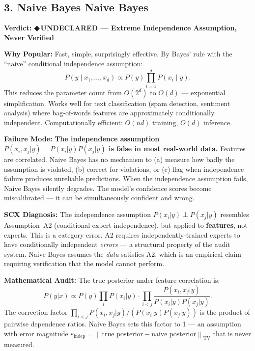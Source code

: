 \documentclass[12pt,a4paper]{article}
\theoremstyle{definition}
\newcommand{\guilty}{{\color{guiltycolor}\textbf{◆\,UNDECLARED}}}
\DeclareMathOperator{\TV}{TV}
\newcommand{\norm}[1]{\left\lVert#1\right\rVert}
\newcommand{\auditHeader}[1]{\medskip\noindent\textbf{\large #1}\medskip}
\newcommand{\whyPopular}{\noindent\textbf{Why Popular:} }
\newcommand{\whyFail}{\noindent\textbf{Failure Mode:} }
\newcommand{\diagnosis}{\noindent\textbf{SCX Diagnosis:} }
\newcommand{\mathAudit}{\noindent\textbf{Mathematical Audit:} }
\begin{document}
\subsection{3. Naive Bayes Naive Bayes}

\auditHeader{Verdict: \guilty{} — Extreme Independence Assumption, Never Verified}

\whyPopular{} Fast, simple, surprisingly effective. By Bayes' rule with the ``naive'' conditional independence assumption:
\[
P(y \mid x_1, \ldots, x_d) \propto P(y) \prod_{i=1}^d P(x_i \mid y).
\]
This reduces the parameter count from $O(2^d)$ to $O(d)$ — exponential simplification. Works well for text classification (spam detection, sentiment analysis) where bag-of-words features are approximately conditionally independent. Computationally efficient: $O(nd)$ training, $O(d)$ inference.

\whyFail{} \textbf{The independence assumption $P(x_i, x_j|y) = P(x_i|y)P(x_j|y)$ is false in most real-world data.} Features are correlated. Naive Bayes has no mechanism to (a) measure how badly the assumption is violated, (b) correct for violations, or (c) flag when independence failure produces unreliable predictions. When the independence assumption fails, Naive Bayes silently degrades. The model's confidence scores become miscalibrated — it can be simultaneously confident and wrong.

\diagnosis{} The independence assumption $P(x_i|y) \perp P(x_j|y)$ resembles Assumption~A2 (conditional expert independence), but applied to \textbf{features}, not experts. This is a category error. A2 requires independently-trained experts to have conditionally independent \textit{errors} — a structural property of the audit system. Naive Bayes assumes the \textit{data} satisfies A2, which is an empirical claim requiring verification that the model cannot perform.

\mathAudit{} The true posterior under feature correlation is:
\[
P(y|x) \propto P(y) \prod_i P(x_i|y) \cdot \prod_{i<j} \frac{P(x_i, x_j|y)}{P(x_i|y)P(x_j|y)}.
\]
The correction factor $\prod_{i<j} P(x_i, x_j|y) / (P(x_i|y)P(x_j|y))$ is the product of pairwise dependence ratios. Naive Bayes sets this factor to 1 — an assumption with error magnitude $\varepsilon_{\text{indep}} = \norm{\text{true posterior} - \text{naive posterior}}_{\TV}$ that is never measured.
\end{document}
